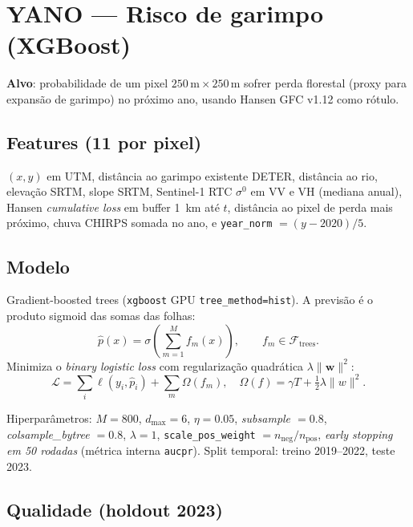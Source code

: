 \documentclass[10pt,a4paper]{article}
\newcommand{\tune}[1]{\textcolor{orange!70!black}{\textit{#1}}}
\begin{document}
\section{YANO — Risco de garimpo (XGBoost)}

\textbf{Alvo}: probabilidade de um pixel $250\,\text{m} \times 250\,\text{m}$
sofrer perda florestal (proxy para expansão de garimpo) no próximo ano, usando
Hansen GFC v1.12 como rótulo.

\subsection*{Features (11 por pixel)}

$(x, y)$ em UTM, distância ao garimpo existente DETER, distância ao rio,
elevação SRTM, slope SRTM, Sentinel-1 RTC $\sigma^0$ em VV e VH (mediana
anual), Hansen \textit{cumulative loss} em buffer 1~km até $t$, distância ao
pixel de perda mais próximo, chuva CHIRPS somada no ano, e \texttt{year\_norm}
$=(y-2020)/5$.

\subsection*{Modelo}

Gradient-boosted trees (\texttt{xgboost} GPU \texttt{tree\_method=hist}). A
previsão é o produto sigmoid das somas das folhas:
\begin{equation}
  \hat{p}(x) = \sigma\!\left(\sum_{m=1}^{M} f_m(x)\right),
  \qquad f_m \in \mathcal{F}_{\text{trees}}.
\end{equation}
Minimiza o \textit{binary logistic loss} com regularização quadrática
$\lambda \|\mathbf{w}\|^2$:
\begin{equation}
  \mathcal{L} = \sum_i \ell(y_i, \hat{p}_i) + \sum_m \Omega(f_m),
  \quad \Omega(f) = \gamma T + \tfrac{1}{2}\lambda \|w\|^2.
\end{equation}

Hiperparâmetros: \tune{$M=800$}, \tune{$d_{\max}=6$}, \tune{$\eta=0.05$},
\tune{subsample $=0.8$}, \tune{colsample\_bytree $=0.8$}, $\lambda=1$,
\texttt{scale\_pos\_weight} $= n_{\text{neg}}/n_{\text{pos}}$, \tune{early
stopping em 50 rodadas} (métrica interna \texttt{aucpr}).
Split temporal: treino 2019–2022, teste 2023.

\subsection*{Qualidade (holdout 2023)}
\end{document}
